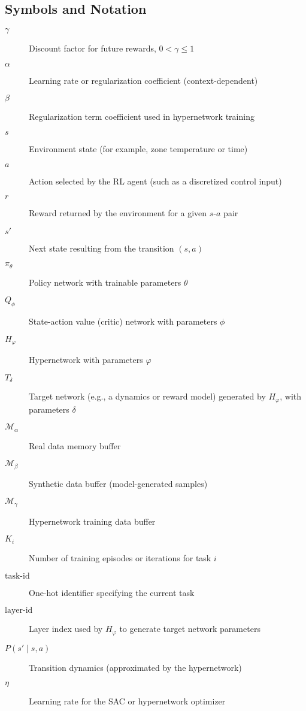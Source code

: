 \subsection*{Symbols and Notation}
\begin{description}
  \item[\(\gamma\)] Discount factor for future rewards, \(0 < \gamma \le 1\)
  \item[\(\alpha\)] Learning rate or regularization coefficient (context-dependent)
  \item[\(\beta\)] Regularization term coefficient used in hypernetwork training
  \item[\(s\)] Environment state (for example, zone temperature or time)
  \item[\(a\)] Action selected by the RL agent (such as a discretized control input)
  \item[\(r\)] Reward returned by the environment for a given \(s\)-\(a\) pair
  \item[\(s'\)] Next state resulting from the transition \((s,a)\)
  \item[\(\pi_\theta\)] Policy network with trainable parameters \(\theta\)
  \item[\(Q_\phi\)] State-action value (critic) network with parameters \(\phi\)
  \item[\(H_\varphi\)] Hypernetwork with parameters \(\varphi\)
  \item[\(T_\delta\)] Target network (e.g., a dynamics or reward model) generated by \(H_\varphi\), with parameters \(\delta\)
  \item[\(\mathcal{M}_\alpha\)] Real data memory buffer
  \item[\(\mathcal{M}_\beta\)] Synthetic data buffer (model-generated samples)
  \item[\(\mathcal{M}_\gamma\)] Hypernetwork training data buffer
  \item[\(K_i\)] Number of training episodes or iterations for task \(i\)
  \item[\(\text{task-id}\)] One-hot identifier specifying the current task
  \item[\(\text{layer-id}\)] Layer index used by \(H_\varphi\) to generate target network parameters
  \item[\(P(s' \mid s,a)\)] Transition dynamics (approximated by the hypernetwork)
  \item[\(\eta\)] Learning rate for the SAC or hypernetwork optimizer
\end{description}

